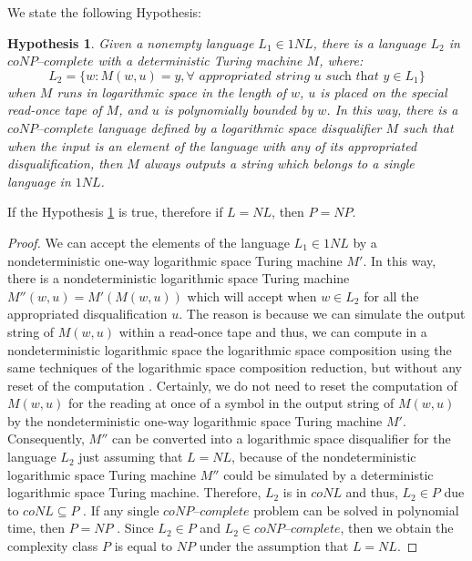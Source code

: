 \documentclass[a4paper,UKenglish,cleveref, autoref]{lipics-v2019}
\newtheorem{hypothesis}[theorem]{Hypothesis}
\begin{document}
We state the following Hypothesis:

\begin{hypothesis}
\label{hypothesis2}
Given a nonempty language $L_{1} \in 1NL$, there is a language $L_{2}$ in $\textit{coNP--complete}$ with a deterministic Turing machine $M$, where:
\[L_{2} = \{w: M(w, u) = y, \forall \textit{ appropriated string } u \textit{ such that } y \in L_{1}\}\]
when $M$ runs in logarithmic space in the length of $w$, $u$ is placed on the special read-once tape of $M$, and $u$ is polynomially bounded by $w$. In this way, there is a $\textit{coNP--complete}$ language defined by a logarithmic space disqualifier $M$ such that when the input is an element of the language with any of its appropriated disqualification, then $M$ always outputs a string which belongs to a single language in $1NL$.
\end{hypothesis}

\begin{theorem}
\label{pos-implication}
If the Hypothesis \ref{hypothesis2} is true, therefore if $L = NL$, then $P = NP$.
\end{theorem}

\begin{proof}
We can accept the elements of the language $L_{1} \in 1NL$ by a nondeterministic one-way logarithmic space Turing machine $M'$. In this way, there is a nondeterministic logarithmic space Turing machine $M''(w, u) = M'(M(w, u))$ which will accept when $w \in L_{2}$ for all the appropriated disqualification $u$. The reason is because we can simulate the output string of $M(w, u)$ within a read-once tape and thus, we can compute in a nondeterministic logarithmic space the logarithmic space composition using the same techniques of the logarithmic space composition reduction, but without any reset of the computation \cite{Pap03}. Certainly, we do not need to reset the computation of $M(w, u)$ for the reading at once of a symbol in the output string of $M(w, u)$ by the nondeterministic one-way logarithmic space Turing machine $M'$. Consequently, $M''$ can be converted into a logarithmic space disqualifier for the language $L_{2}$ just assuming that $L = NL$, because of the nondeterministic logarithmic space Turing machine $M''$ could be simulated by a deterministic logarithmic space Turing machine. Therefore, $L_{2}$ is in $coNL$ and thus, $L_{2} \in P$ due to $coNL \subseteq P$ \cite{Pap03}. If any single $\textit{coNP--complete}$ problem can be solved in polynomial time, then $P = NP$ \cite{Pap03}. Since $L_{2} \in P$ and $L_{2} \in \textit{coNP--complete}$, then we obtain the complexity class $P$ is equal to $NP$ under the assumption that $L = NL$.
\end{proof}
\end{document}
